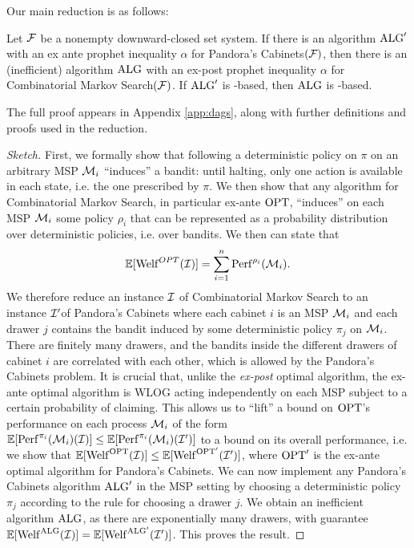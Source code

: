 Our main reduction is as follows:
\begin{theorem} \label{thm:pc-cms}
  Let $\mathcal{F}$ be a nonempty downward-closed set system.
  If there is an algorithm $\mathrm{ALG}'$ with an ex ante prophet inequality $\alpha$ for Pandora's Cabinets$(\mathcal{F})$, then there is an (inefficient) algorithm $\mathrm{ALG}$ with an ex-post prophet inequality $\alpha$ for Combinatorial Markov Search$(\mathcal{F})$.
  If $\mathrm{ALG}'$ is \SAUP-based, then $\mathrm{ALG}$ is \SAUP-based.
\end{theorem}
The full proof appears in Appendix \ref{app:dags}, along with further definitions and proofs used in the reduction.
\begin{proof}[Sketch]
  First, we formally show that following a deterministic policy on $\pi$ on an arbitrary MSP $\mathcal{M}_i$ ``induces'' a bandit: until halting, only one action is available in each state, i.e. the one prescribed by $\pi$.
  We then show that any algorithm for Combinatorial Markov Search, in particular ex-ante $\mathrm{OPT}$, ``induces'' on each MSP $\mathcal{M}_i$ some policy $\rho_i$ that can be represented as a probability distribution over deterministic policies, i.e. over bandits.
  We then can state that
  \[ \operatorname*{\mathbb{E}}[\mathrm{Welf}^{OPT}(\mathcal{I})] = \sum_{i=1}^n \mathrm{Perf}^{\rho_i}(\mathcal{M}_i). \]
  We therefore reduce an instance $\mathcal{I}$ of Combinatorial Markov Search to an instance $\mathcal{I}'$of Pandora's Cabinets where each cabinet $i$ is an MSP $\mathcal{M}_i$ and each drawer $j$ contains the bandit induced by some deterministic policy $\pi_j$ on $\mathcal{M}_i$.
  There are finitely many drawers, and the bandits inside the different drawers of cabinet $i$ are correlated with each other, which is allowed by the Pandora's Cabinets problem.
  It is crucial that, unlike the \emph{ex-post} optimal algorithm, the ex-ante optimal algorithm is WLOG acting independently on each MSP subject to a certain probability of claiming.
  This allows us to ``lift'' a bound on $\mathrm{OPT}$'s performance on each process $\mathcal{M}_i$ of the form $\operatorname*{\mathbb{E}}[ \mathrm{Perf}^{\pi_i}(\mathcal{M}_i)(\mathcal{I}) ] \leq \operatorname*{\mathbb{E}}[ \mathrm{Perf}^{\pi_i}(\mathcal{M}_i)(\mathcal{I}')]$  to a bound on its overall performance, i.e. we show that $\operatorname*{\mathbb{E}}[\mathrm{Welf}^{\mathrm{OPT}}(\mathcal{I})] \leq \operatorname*{\mathbb{E}}[\mathrm{Welf}^{\mathrm{OPT}'}(\mathcal{I}')]$, where $\mathrm{OPT}'$ is the ex-ante optimal algorithm for Pandora's Cabinets.
  We can now implement any Pandora's Cabinets algorithm $\mathrm{ALG}'$ in the MSP setting by choosing a deterministic policy $\pi_j$ according to the rule for choosing a drawer $j$.
  We obtain an inefficient algorithm $\mathrm{ALG}$, as there are exponentially many drawers, with guarantee $\operatorname*{\mathbb{E}}[\mathrm{Welf}^{\mathrm{ALG}}(\mathcal{I})] = \operatorname*{\mathbb{E}}[\mathrm{Welf}^{\mathrm{ALG}'}(\mathcal{I}')]$.
  This proves the result.
\end{proof}

